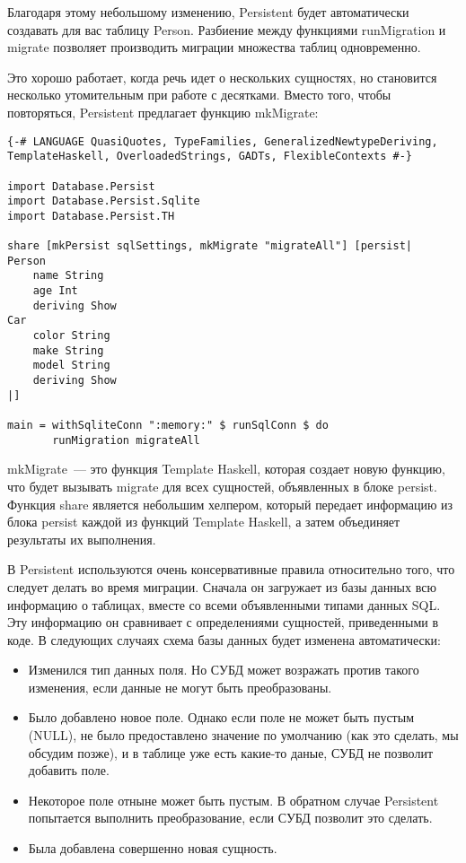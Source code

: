 Благодаря этому небольшому изменению, Persistent будет автоматически создавать для вас таблицу Person. Разбиение между функциями runMigration и migrate позволяет производить миграции множества таблиц одновременно.

Это хорошо работает, когда речь идет о нескольких сущностях, но становится несколько утомительным при работе с десятками. Вместо того, чтобы повторяться, Persistent предлагает функцию mkMigrate:

\begin{lstlisting}
{-# LANGUAGE QuasiQuotes, TypeFamilies, GeneralizedNewtypeDeriving, TemplateHaskell, OverloadedStrings, GADTs, FlexibleContexts #-}

import Database.Persist
import Database.Persist.Sqlite
import Database.Persist.TH

share [mkPersist sqlSettings, mkMigrate "migrateAll"] [persist|
Person
    name String
    age Int
    deriving Show
Car
    color String
    make String
    model String
    deriving Show
|]

main = withSqliteConn ":memory:" $ runSqlConn $ do
       runMigration migrateAll
\end{lstlisting}%

mkMigrate~--- это функция Template Haskell, которая создает новую функцию, что будет вызывать migrate для всех сущностей, объявленных в блоке persist. Функция share является небольшим хелпером, который передает информацию из блока persist каждой из функций Template Haskell, а затем объединяет результаты их выполнения.

В Persistent используются очень консервативные правила относительно того, что следует делать во время миграции. Сначала он загружает из базы данных всю информацию о таблицах, вместе со всеми объявленными типами данных SQL. Эту информацию он сравнивает с определениями сущностей, приведенными в коде. В следующих случаях схема базы данных будет изменена автоматически:

\begin{itemize}
	\item Изменился тип данных поля. Но СУБД может возражать против такого изменения, если данные не могут быть преобразованы.
	\item Было добавлено новое поле. Однако если поле не может быть пустым (NULL), не было предоставлено значение по умолчанию (как это сделать, мы обсудим позже), и в таблице уже есть какие-то даные, СУБД не позволит добавить поле.
	\item Некоторое поле отныне может быть пустым. В обратном случае Persistent попытается выполнить преобразование, если СУБД позволит это сделать.
	\item Была добавлена совершенно новая сущность.
\end{itemize}

